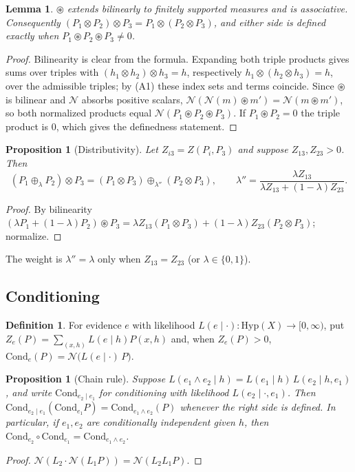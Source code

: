 \documentclass[11pt]{article}
\newtheorem{proposition}[theorem]{Proposition}
\newtheorem{lemma}[theorem]{Lemma}
\theoremstyle{definition}
\newtheorem{definition}[theorem]{Definition}
\theoremstyle{remark}
\newcommand{\Hyp}{\mathrm{Hyp}}
\newcommand{\Cond}{\mathrm{Cond}}
\newcommand{\N}{\mathcal{N}}
\newcommand{\cp}{\circledast}
\begin{document}
\begin{lemma}\label{lem:assoc}
$\cp$ extends bilinearly to finitely supported measures and is associative. Consequently
$(P_1\otimes P_2)\otimes P_3=P_1\otimes(P_2\otimes P_3)$, and either side is defined exactly when
$P_1\cp P_2\cp P_3\neq 0$.
\end{lemma}
\begin{proof}
Bilinearity is clear from the formula. Expanding both triple products gives sums over triples with
$(h_1\otimes h_2)\otimes h_3=h$, respectively $h_1\otimes(h_2\otimes h_3)=h$, over the admissible
triples; by (A1) these index sets and terms coincide. Since $\cp$ is bilinear and $\N$ absorbs
positive scalars, $\N(\N(m)\cp m')=\N(m\cp m')$, so both normalized products equal
$\N(P_1\cp P_2\cp P_3)$. If $P_1\cp P_2=0$ the triple product is $0$, which gives the definedness
statement.
\end{proof}

\begin{proposition}[Distributivity]\label{prop:distrib}
Let $Z_{i3}=Z(P_i,P_3)$ and suppose $Z_{13},Z_{23}>0$. Then
\[
(P_1\oplus_\lambda P_2)\otimes P_3=(P_1\otimes P_3)\oplus_{\lambda''}(P_2\otimes P_3),\qquad
\lambda''=\frac{\lambda Z_{13}}{\lambda Z_{13}+(1-\lambda)Z_{23}} .
\]
\end{proposition}
\begin{proof}
By bilinearity $(\lambda P_1+(1-\lambda)P_2)\cp P_3=\lambda Z_{13}(P_1\otimes P_3)+(1-\lambda)Z_{23}
(P_2\otimes P_3)$; normalize.
\end{proof}

The weight is $\lambda''=\lambda$ only when $Z_{13}=Z_{23}$ (or $\lambda\in\{0,1\}$).

\subsection{Conditioning}

\begin{definition}
For evidence $e$ with likelihood $L(e\mid\cdot)\colon\Hyp(X)\to[0,\infty)$, put
$Z_e(P)=\sum_{(x,h)}L(e\mid h)P(x,h)$ and, when $Z_e(P)>0$,
$\Cond_e(P)=\N\big(L(e\mid\cdot)\,P\big)$.
\end{definition}

\begin{proposition}[Chain rule]
Suppose $L(e_1\wedge e_2\mid h)=L(e_1\mid h)\,L(e_2\mid h,e_1)$, and write $\Cond_{e_2\mid e_1}$ for
conditioning with likelihood $L(e_2\mid\cdot,e_1)$. Then
$\Cond_{e_2\mid e_1}(\Cond_{e_1}P)=\Cond_{e_1\wedge e_2}(P)$ whenever the right side is defined. In
particular, if $e_1,e_2$ are conditionally independent given $h$, then
$\Cond_{e_2}\circ\Cond_{e_1}=\Cond_{e_1\wedge e_2}$.
\end{proposition}
\begin{proof}
$\N(L_2\cdot\N(L_1P))=\N(L_2L_1P)$.
\end{proof}
\end{document}
